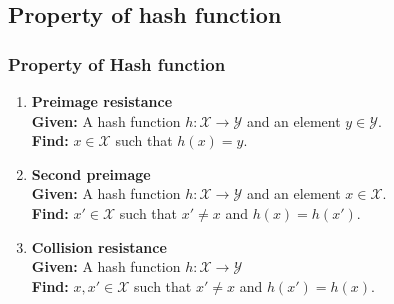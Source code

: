 \documentclass{beamer}
\begin{document}
\subsection{Property of hash function}
\begin{frame}
  \frametitle{Property of Hash function\footnotemark}
  \begin{enumerate}
  \item {\bf Preimage resistance} \\
  {\bf Given:} A hash function $h : \mathcal{X} \to \mathcal{Y}$ and an element $y \in \mathcal{Y}$. \\
  {\bf Find:} $x \in \mathcal{X}$ such that $h(x) = y$.
  \item {\bf Second preimage} \\
  {\bf Given:} A hash function $h : \mathcal{X} \to \mathcal{Y}$ and an element $x \in \mathcal{X}$. \\
  {\bf Find:} $x' \in \mathcal{X}$ such that $x' \neq x$ and $h(x) = h(x')$.
  \item {\bf Collision resistance} \\
  {\bf Given:} A hash function $h : \mathcal{X} \to \mathcal{Y}$ \\
  {\bf Find:} $x, x' \in \mathcal{X}$ such that $x' \neq x$ and $h(x') = h(x)$. 
  \end{enumerate}
\end{frame}

\end{document}
